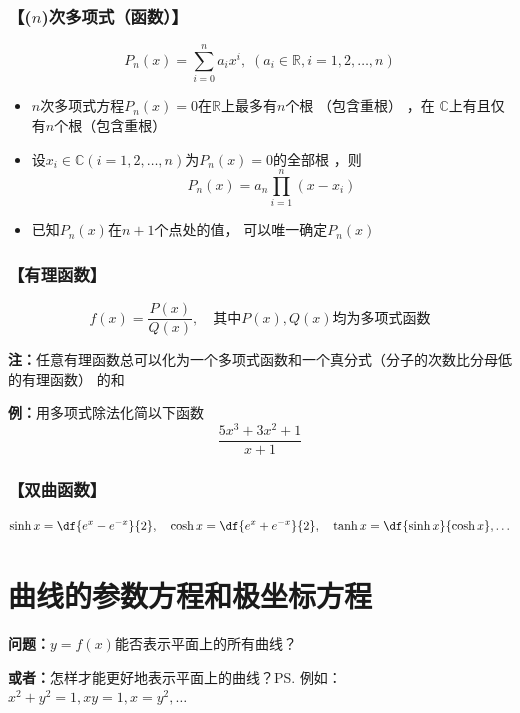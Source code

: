 \subsubsection{【($n$)次多项式（函数）】}

  $$P_n(x)=\sum_{i=0}^na_ix^i,
  \;(a_i\in\mathbb{R},i=1,2,\ldots,n)$$
  \begin{itemize}
    \item { $n$次多项式方程$P_n(x)=0$在$\mathbb{R}$上最多有$n$个根 （包含重根） ，在
    $\mathbb{C}$上有且仅有$n$个根（包含重根）}
    \item { 设$x_i\in\mathbb{C}(i=1,2,\ldots,n)$为$P_n(x)=0$的全部根 ，则
    $$P_n(x)=a_n\prod_{i=1}^n(x-x_i)$$}
    \item { 已知$P_n(x)$在$n+1$个点处的值， 可以唯一确定$P_n(x)$}
  \end{itemize}

\subsubsection{【有理函数】}

$$f(x)=\frac{P(x)}{Q(x)}, \quad\mbox{其中}P(x),Q(x)\mbox{均为多项式函数}$$
  
{\bf 注：}任意有理函数总可以化为一个多项式函数和一个真分式（分子的次数比分母低的有理函数）
的和
	  
{{\bf 例：}用多项式除法化简以下函数}
$$\frac{5x^3+3x^2+1}{x+1}$$

\subsubsection{【双曲函数】}

{\small $$\sinh x =\df{e^x-e^{-x}}{2}, \quad
\cosh x =\df{e^x+e^{-x}}{2}, \quad\tanh x=\df{\sinh
x}{\cosh x}, \ldots$$}

\section{曲线的参数方程和极坐标方程}

{\bf 问题：}$y=f(x)$能否表示平面上的所有曲线？
	
{\bf 或者：}怎样才能更好地表示平面上的曲线？\ps{例如：$x^2+y^2=1,xy=1,x=y^2,\ldots$}

